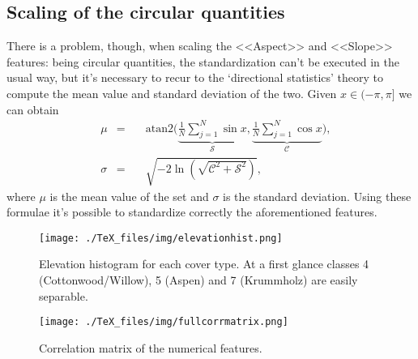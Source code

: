 \subsection{Scaling of the circular quantities}
There is a problem, though, when scaling the <<Aspect>> and <<Slope>> features: being circular quantities, the standardization can't be executed in the usual way, but it's necessary to recur to the `directional statistics' theory to compute the mean value and standard deviation of the two. Given $x\in(-\pi,\pi]$ we can obtain
$$
\begin{aligned}
&\mu&=&\quad\text{atan2}\Bigg(\underbrace{\frac{1}{N}\sum_{j=1}^{N}\sin{x}}_{\mathcal{S}},\underbrace{\frac{1}{N}\sum_{j=1}^{N}\cos{x}}_{\mathcal{C}}\Bigg) \text{,}\\
&\sigma&=&\quad\sqrt{-2\ln\left(\sqrt{\mathcal{C}^2+\mathcal{S}^2}\right)}\text{,}
\end{aligned}
$$   
where $\mu$ is the mean value of the set and $\sigma$ is the standard deviation. Using these formulae it's possible to standardize correctly the aforementioned features.
\begin{figure}
\centering
\texttt{[image: ./TeX\_files/img/elevationhist.png]}
\caption{Elevation histogram for each cover type. At a first glance classes 4 (Cottonwood/Willow), 5 (Aspen) and 7 (Krummholz) are easily separable.}
\label{fig:elevationhist}
\end{figure}
\begin{sidewaysfigure}
\centering
\texttt{[image: ./TeX\_files/img/fullcorrmatrix.png]}
\caption{Correlation matrix of the numerical features.}
\label{fig:fullcorrmatrix}
\end{sidewaysfigure}